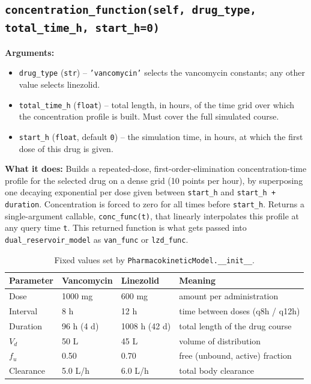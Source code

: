 \documentclass[11pt]{article}
\begin{document}
\subsection{\texttt{concentration\_function(self, drug\_type, total\_time\_h, start\_h=0)}}

\textbf{Arguments:}
\begin{itemize}
\item \texttt{drug\_type} (\texttt{str}) -- \texttt{'vancomycin'} selects
the vancomycin constants; any other value selects linezolid.
\item \texttt{total\_time\_h} (\texttt{float}) -- total length, in hours, of
the time grid over which the concentration profile is built. Must cover the
full simulated course.
\item \texttt{start\_h} (\texttt{float}, default \texttt{0}) -- the
simulation time, in hours, at which the first dose of this drug is given.
\end{itemize}

\textbf{What it does:} Builds a repeated-dose, first-order-elimination
concentration-time profile for the selected drug on a dense grid (10 points
per hour), by superposing one decaying exponential per dose given between
\texttt{start\_h} and \texttt{start\_h + duration}. Concentration is forced
to zero for all times before \texttt{start\_h}. Returns a single-argument
callable, \texttt{conc\_func(t)}, that linearly interpolates this profile at
any query time \texttt{t}. This returned function is what gets passed into
\texttt{dual\_reservoir\_model} as \texttt{van\_func} or \texttt{lzd\_func}.

\begin{table}[H]
\centering
\small
\renewcommand{\arraystretch}{1.15}
\caption{Fixed values set by \texttt{PharmacokineticModel.\_\_init\_\_}.}
\vspace{0.5cm}
\begin{tabularx}{\textwidth}{l l l X}
\hline
\textbf{Parameter} & \textbf{Vancomycin} & \textbf{Linezolid} & \textbf{Meaning} \\
\hline
Dose & 1000 mg & 600 mg & amount per administration \\
Interval & 8 h & 12 h & time between doses (q8h / q12h) \\
Duration & 96 h (4 d) & 1008 h (42 d) & total length of the drug course \\
$V_d$ & 50 L & 45 L & volume of distribution \\
$f_u$ & 0.50 & 0.70 & free (unbound, active) fraction \\
Clearance & 5.0 L/h & 6.0 L/h & total body clearance \\
\hline
\end{tabularx}
\label{tab:pk}
\end{table}
\end{document}
